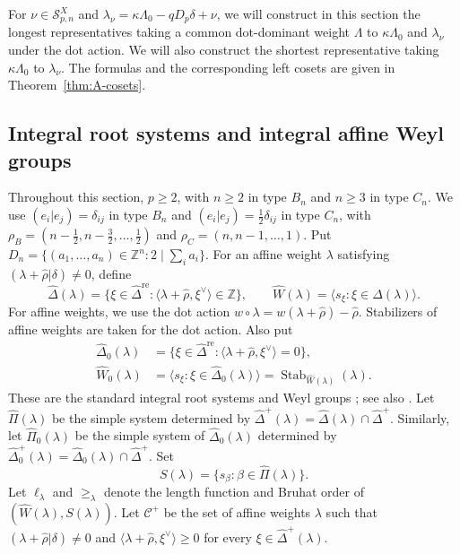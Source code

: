 \documentclass[11pt,a4paper]{amsart}
\newcommand{\ZZ}{\mathbb Z}
\newcommand{\Stab}{\operatorname{Stab}}
\theoremstyle{plain}
\numberwithin{equation}{section}
\def\geq{\geqslant}
\begin{document}
For \(\nu\in\mathcal S^X_{p,n}\)  and
\(\lambda_\nu=\kappa\Lambda_0-qD_p\delta+\nu\), 
we will construct in this section the  longest representatives taking a common dot-dominant weight
\(\Lambda\) to \(\kappa\Lambda_0\) and \(\lambda_\nu\)
under the dot action.
We will also construct the shortest representative taking
\(\kappa\Lambda_0\) to \(\lambda_\nu\).
The formulas and the corresponding left cosets are given in
Theorem~\ref{thm:A-cosets}.

\subsection{Integral root systems and integral affine Weyl groups}
Throughout this section, \(p\ge2\), with \(n\ge2\) in type
\(B_n\) and \(n\ge3\) in type \(C_n\). We use
$(e_i|e_j)=\delta_{ij}$ in type $B_n$ and
$(e_i|e_j)=\frac12\delta_{ij}$ in type $C_n$, with
\(\rho_B=(n-\frac12,n-\frac32,\ldots,\frac12)\) and
\(\rho_C=(n,n-1,\ldots,1)\). Put
\(D_n=\{(a_1,\ldots,a_n)\in\ZZ^n:2\mid\sum_i a_i\}\).
For an affine weight \(\lambda\) satisfying
\((\lambda+\widehat\rho|\delta)\ne0\), define
\[
\widehat\Delta(\lambda)=
\{\xi\in\widehat\Delta^{\mathrm{re}}:
\langle\lambda+\widehat\rho,\xi^\vee\rangle\in\ZZ\},
\qquad
\widehat W(\lambda)=\langle s_\xi:\xi\in\widehat\Delta(\lambda)\rangle.
\]
For affine weights, we use the dot action
\(w\circ\lambda=w(\lambda+\widehat\rho)-\widehat\rho\).
Stabilizers of affine weights are taken for the dot action.
Also put
\begin{equation}
\begin{aligned}
\widehat\Delta_0(\lambda)
&=\{\xi\in\widehat\Delta^{\mathrm{re}}:
\langle\lambda+\widehat\rho,\xi^\vee\rangle=0\},\\
\widehat W_0(\lambda)
&=\langle s_\xi:\xi\in\widehat\Delta_0(\lambda)\rangle
=\Stab_{\widehat W(\lambda)}(\lambda).
\end{aligned}
\label{eq:A-stab}
\end{equation}
These are the standard integral root systems and Weyl groups
\cite[\S2]{KT00}; see also \cite{Ara14}.
Let \(\widehat\Pi(\lambda)\) be the simple system determined by
\(\widehat\Delta^+(\lambda)
=\widehat\Delta(\lambda)\cap\widehat\Delta^+\).
Similarly, let \(\widehat\Pi_0(\lambda)\) be the simple system of
\(\widehat\Delta_0(\lambda)\) determined by
\(\widehat\Delta_0^+(\lambda)
=\widehat\Delta_0(\lambda)\cap\widehat\Delta^+\).
Set
\[
S(\lambda)=\{s_\beta:\beta\in\widehat\Pi(\lambda)\}.
\]
Let \(\ell_\lambda\) and \(\geq_\lambda\) denote the length function
and Bruhat order of \((\widehat W(\lambda),S(\lambda))\).
Let \(\mathcal C^+\) be the set of affine weights \(\lambda\)
such that \((\lambda+\widehat\rho|\delta)\ne0\) and
\(\langle\lambda+\widehat\rho,\xi^\vee\rangle\ge0\) for every
\(\xi\in\widehat\Delta^+(\lambda)\).
\end{document}
